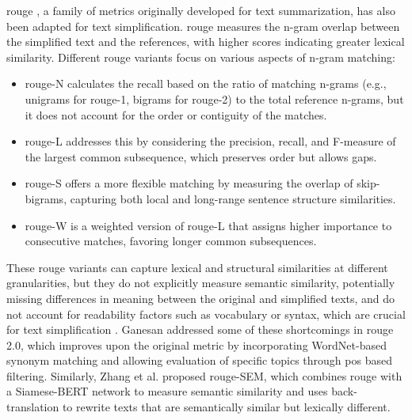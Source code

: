 \gls{rouge} \cite{xu-etal-2016-optimizing}, a family of metrics originally developed for text summarization, has also been adapted for text simplification.
\gls{rouge} measures the n-gram overlap between the simplified text and the references, with higher scores indicating greater lexical similarity.
Different \gls{rouge} variants focus on various aspects of n-gram matching:
\begin{itemize}
    \item \gls{rouge}-N calculates the recall based on the ratio of matching n-grams (e.g., unigrams for \gls{rouge}-1, bigrams for \gls{rouge}-2) to the total reference n-grams, but it does not account for the order or contiguity of the matches. 
    \item \gls{rouge}-L addresses this by considering the precision, recall, and F-measure of the largest common subsequence, which preserves order but allows gaps. 
    \item \gls{rouge}-S offers a more flexible matching by measuring the overlap of skip-bigrams, capturing both local and long-range sentence structure similarities. 
    \item \gls{rouge}-W is a weighted version of \gls{rouge}-L that assigns higher importance to consecutive matches, favoring longer common subsequences.
\end{itemize}
These \gls{rouge} variants can capture lexical and structural similarities at different granularities, but they do not explicitly measure semantic similarity, potentially missing differences in meaning between the original and simplified texts, and do not account for readability factors such as vocabulary or syntax, which are crucial for text simplification \cite{xu2024reasoningcomparisonllmenhancedsemantic}.
Ganesan \cite{ganesan2018rouge20updatedimproved} addressed some of these shortcomings in \gls{rouge} 2.0, which improves upon the original metric by incorporating WordNet-based synonym matching and allowing evaluation of specific topics through \gls{pos} based filtering. Similarly, Zhang et al. \cite{ZHANG2024121364} proposed \gls{rouge}-SEM, which combines \gls{rouge} with a Siamese-BERT network to measure semantic similarity and uses back-translation to rewrite texts that are semantically similar but lexically different.

